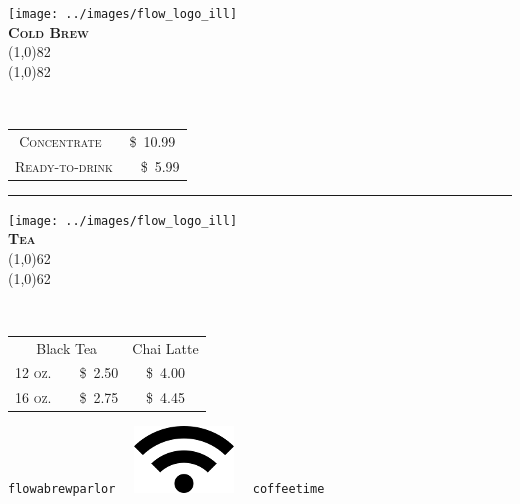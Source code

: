 \documentclass[letterpaper, 12pt]{article}%
\newcommand{\ill}{
\texttt{[image: ../images/flow\_logo\_ill]}
}
\newcommand{\menuentry}[2]{
 \emph{\footnotesize#1}\\
 \vspace*{\fill}
 {\small#2}
}
\newcommand{\menuitem}[4]{
 \centering
  \ill\\
  \smallskip\vspace{0.1em}
  \textbf{\sffamily \textsc{\large#2}}\vspace{-1ex}\\
  \line(1,0){#1}\vspace{-2ex}\\
  \line(1,0){#1}\vspace{0.5ex}\\
  \smallskip
  \menuentry{#3}{#4}
}
\newcommand{\flowtherefore}{~~\raisebox{0.2ex}{$\therefore$}~~}
\newcommand{\price}[2]{
 \textsc{\small#1}\flowtherefore\$~\textsc{\small#2}
}
\newcommand{\varprice}[1]{
 \$~\textsc{\small#1}
}
\begin{document}
\newlength{\coffeerowtwo}
\setlength{\coffeerowtwo}{0.18\textwidth}
{\centering
   
    
 \begin{minipage}[t][\coffeerowtwo][b]{0.3\textwidth}
  \centering
  \menuitem{82}{
   Cold Brew}{\vspace{-1ex}
   }{
   \begin{tabular}{@{} c @{}}
   \price{Concentrate}{10.99}\\
   \price{Ready-to-drink}{5.99}\\
   \end{tabular}
   
   \rule{0pt}{2.2em}
    
  }
 \end{minipage} 
 \rule{3em}{0pt}
 \begin{minipage}[t][\coffeerowtwo][b]{0.3\textwidth}
  \centering
  \menuitem{62}{
   Tea}{
   }{
   \begin{tabular}{@{} c c @{}}
   Black Tea & Chai Latte\\
   \price{12 oz.}{2.50} & \varprice{4.00}\\
   \price{16 oz.}{2.75} & \varprice{4.45}\\
   \end{tabular}
   
   \rule{0pt}{1.2em}
    
  }
 \end{minipage} 
 
 
}



{\centering
 \texttt{\large flowabrewparlor}
 ~~\includegraphics{wifi}~~
 \texttt{\large coffeetime}
 \vspace{0.5em}
 
} 
\end{document}
